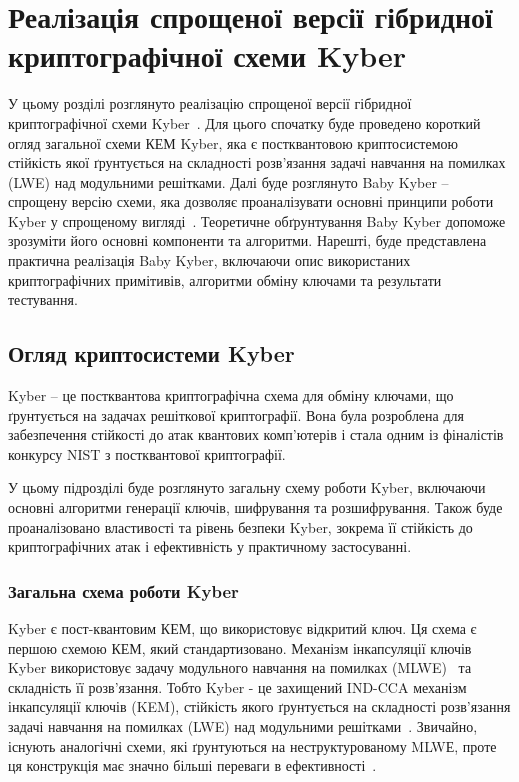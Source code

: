 
\chapter{Реалізація спрощеної версії гібридної криптографічної схеми Kyber}
\label{chap:chapter1}  

У цьому розділі розглянуто реалізацію спрощеної версії гібридної криптографічної схеми Kyber~\cite{KyberWebsite}. Для цього спочатку буде проведено короткий огляд загальної схеми КЕМ Kyber, яка є постквантовою криптосистемою стійкість якої ґрунтується на складності розв’язання задачі навчання на помилках (LWE) над модульними решітками. Далі буде розглянуто Baby Kyber – спрощену версію схеми, яка дозволяє проаналізувати основні принципи роботи Kyber у спрощеному вигляді~\cite{babyKyber}. Теоретичне обґрунтування Baby Kyber допоможе зрозуміти його основні компоненти та алгоритми. Нарешті, буде представлена практична реалізація Baby Kyber, включаючи опис використаних криптографічних примітивів, алгоритми обміну ключами та результати тестування.

\section{Огляд криптосистеми Kyber}

Kyber – це постквантова криптографічна схема для обміну ключами, що ґрунтується на задачах решіткової криптографії. Вона була розроблена для забезпечення стійкості до атак квантових комп’ютерів і стала одним із фіналістів конкурсу NIST з постквантової криптографії.  

У цьому підрозділі буде розглянуто загальну схему роботи Kyber, включаючи основні алгоритми генерації ключів, шифрування та розшифрування. Також буде проаналізовано властивості та рівень безпеки Kyber, зокрема її стійкість до криптографічних атак і ефективність у практичному застосуванні.

\subsection*{Загальна схема роботи Kyber}

Kyber є пост-квантовим КЕМ, що використовує відкритий ключ. Ця схема є першою схемою КЕМ, який стандартизовано.  Механізм інкапсуляції ключів Kyber використовує задачу модульного навчання на помилках (MLWE)~\cite{Langlois2012} та складність її розв'язання. Тобто Kyber - це захищений IND-CCA механізм інкапсуляції ключів (KEM), стійкість якого ґрунтується на складності розв'язання задачі навчання на помилках (LWE) над модульними решітками~\cite{KyberWebsite}.  Звичайно, існують аналогічні схеми, які ґрунтуються на неструктурованому MLWЕ, проте ця конструкція має значно більші переваги в ефективності~\cite{Gonzalez2021}.

